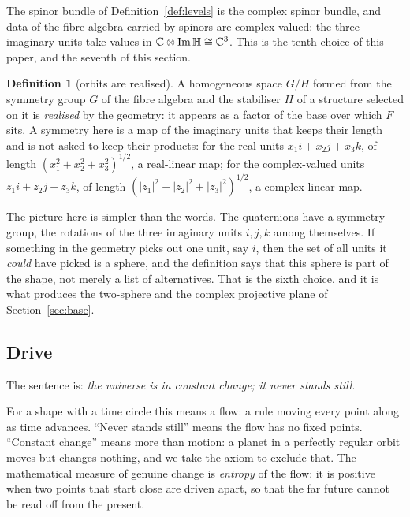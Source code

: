 \documentclass[11pt,a4paper]{article}
\theoremstyle{plain}
\theoremstyle{definition}
\newtheorem{definition}[theorem]{Definition}
\theoremstyle{remark}
\newcommand{\Hquat}{\mathbb{H}}
\newcommand{\ImH}{\operatorname{Im}\Hquat}
\begin{document}
The spinor bundle of Definition~\ref{def:levels} is the complex spinor bundle, and data of the fibre algebra carried by spinors are complex-valued: the three imaginary units take values in $\C\otimes\ImH\cong\C^{3}$.
This is the tenth choice of this paper, and the seventh of this section.

\begin{definition}[orbits are realised]\label{def:orbits}
A homogeneous space $G/H$ formed from the symmetry group $G$ of the fibre algebra and the stabiliser $H$ of a structure selected on it is \emph{realised} by the geometry: it appears as a factor of the base over which $F$ sits. A symmetry here is a map of the imaginary units that keeps their length and is not asked to keep their products: for the real units $x_{1}i+x_{2}j+x_{3}k$, of length $(x_{1}^{2}+x_{2}^{2}+x_{3}^{2})^{1/2}$, a real-linear map; for the complex-valued units $z_{1}i+z_{2}j+z_{3}k$, of length $(\lvert z_{1}\rvert^{2}+\lvert z_{2}\rvert^{2}+\lvert z_{3}\rvert^{2})^{1/2}$, a complex-linear map.
\end{definition}

The picture here is simpler than the words. The quaternions have a symmetry group, the rotations of the three imaginary units $i,j,k$ among themselves. If something in the geometry picks out one unit, say $i$, then the set of all units it \emph{could} have picked is a sphere, and the definition says that this sphere is part of the shape, not merely a list of alternatives. That is the sixth choice, and it is what produces the two-sphere and the complex projective plane of Section~\ref{sec:base}.

\subsection{Drive}\label{sec:A4}

The sentence is: \emph{the universe is in constant change; it never stands still}.

For a shape with a time circle this means a flow: a rule moving every point along as time advances. ``Never stands still'' means the flow has no fixed points. ``Constant change'' means more than motion: a planet in a perfectly regular orbit moves but changes nothing, and we take the axiom to exclude that. The mathematical measure of genuine change is \emph{entropy} of the flow: it is positive when two points that start close are driven apart, so that the far future cannot be read off from the present.
\end{document}
